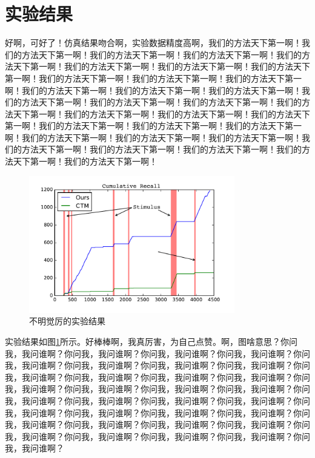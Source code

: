 \documentclass[a4paper,12pt]{book} %
\begin{document}
\section{实验结果}

好啊，可好了！仿真结果吻合啊，实验数据精度高啊，我们的方法天下第一啊！我们的方法天下第一啊！我们的方法天下第一啊！我们的方法天下第一啊！我们的方法天下第一啊！我们的方法天下第一啊！我们的方法天下第一啊！我们的方法天下第一啊！我们的方法天下第一啊！我们的方法天下第一啊！我们的方法天下第一啊！我们的方法天下第一啊！我们的方法天下第一啊！我们的方法天下第一啊！我们的方法天下第一啊！我们的方法天下第一啊！我们的方法天下第一啊！我们的方法天下第一啊！我们的方法天下第一啊！我们的方法天下第一啊！我们的方法天下第一啊！我们的方法天下第一啊！我们的方法天下第一啊！我们的方法天下第一啊！我们的方法天下第一啊！我们的方法天下第一啊！我们的方法天下第一啊！我们的方法天下第一啊！我们的方法天下第一啊！我们的方法天下第一啊！我们的方法天下第一啊！我们的方法天下第一啊！

\begin{figure}[htbp]
\centering
\includegraphics[width=0.8\textwidth]{loss.pdf}
\caption{不明觉厉的实验结果}
\label{result}
\end{figure}

实验结果如图\ref{result}所示。好棒棒啊，我真厉害，为自己点赞。啊，图啥意思？你问我，我问谁啊？你问我，我问谁啊？你问我，我问谁啊？你问我，我问谁啊？你问我，我问谁啊？你问我，我问谁啊？你问我，我问谁啊？你问我，我问谁啊？你问我，我问谁啊？你问我，我问谁啊？你问我，我问谁啊？你问我，我问谁啊？你问我，我问谁啊？你问我，我问谁啊？你问我，我问谁啊？你问我，我问谁啊？你问我，我问谁啊？你问我，我问谁啊？你问我，我问谁啊？你问我，我问谁啊？你问我，我问谁啊？你问我，我问谁啊？你问我，我问谁啊？你问我，我问谁啊？你问我，我问谁啊？你问我，我问谁啊？你问我，我问谁啊？你问我，我问谁啊？你问我，我问谁啊？你问我，我问谁啊？你问我，我问谁啊？你问我，我问谁啊？你问我，我问谁啊？
\end{document}

